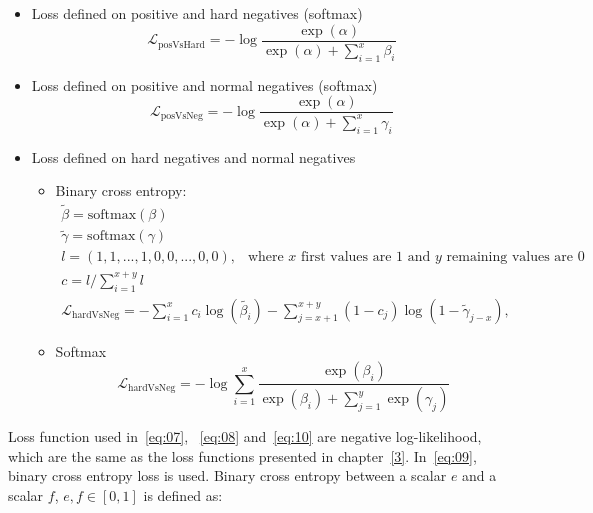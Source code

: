 \documentclass[3p, sort&compress, 12pt]{elsarticle}
\begin{document}
\begin{itemize}
	\item Loss defined on positive and hard negatives (softmax)
	\begin{equation}
		\label{eq:07}
		\mathcal{L}_{\text{posVsHard}} = -\log\dfrac{\exp\left(\alpha\right)}{\exp\left(\alpha\right) + \sum\limits_{i=1}^x\beta_i}
	\end{equation}
	\item Loss defined on positive and normal negatives (softmax)
	\begin{equation}
		\label{eq:08}
		\mathcal{L}_{\text{posVsNeg}} = -\log\dfrac{\exp\left(\alpha\right)}{\exp\left(\alpha\right) + \sum\limits_{i=1}^x\gamma_i}
	\end{equation}
	\item Loss defined on hard negatives and normal negatives
	\begin{itemize}
	\item Binary cross entropy:
	\begin{equation}
		\label{eq:09}
		\begin{array}{l}
		\tilde{\beta} = \text{softmax}(\beta) \\
		\tilde{\gamma} = \text{softmax}(\gamma) \\ 
		l = (1, 1, ..., 1, 0, 0, ... ,0, 0),\:\: \text{ where } x \text{ first values are 1 and } y \text{ remaining values are 0 } \\
		c = l / \sum\limits_{i=1}^{x + y} l \\
		\mathcal{L}_{\text{hardVsNeg}} = -\sum\limits_{i=1}^x c_i\log\left(\tilde{\beta_i}\right) - \sum\limits_{j=x+1}^{x+y}(1 - c_j)\log(1-\tilde{\gamma}_{j-x}),
		\end{array}
	\end{equation}
	\item Softmax
	\begin{equation}
		\label{eq:10}
		\mathcal{L}_{\text{hardVsNeg}} = -\log\sum\limits_{i=1}^x\dfrac{\exp\left(\beta_i\right)}{\exp\left(\beta_i\right) + \sum\limits_{j=1}^y\exp\left(\gamma_j\right)}
	\end{equation}
	\end{itemize}
\end{itemize}
\par Loss function used in~\eqref{eq:07}, ~\eqref{eq:08} and~\eqref{eq:10} are negative log-likelihood, which are the same as the loss functions presented in chapter~\ref{3}. In~\eqref{eq:09}, binary cross entropy loss is used. Binary cross entropy between a scalar $e$ and a scalar $f$, $e, f \in [0, 1]$ is defined as:
\end{document}
